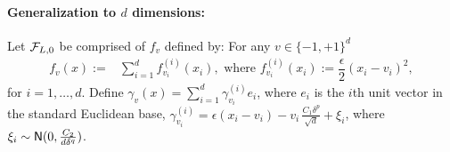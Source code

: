 \paragraph{Generalization to $d$ dimensions:}
Let $\mathcal{F}_{L,0}$ be comprised of $f_v$ defined by: For any $v\in \{-1,+1\}^d$
\begin{align*}
  f_v(x) :=& \sum_{i=1}^d f^{(i)}_{v_i}(x_i), \text{ where } f^{(i)}_{v_i}(x_i) := \dfrac{\epsilon}{2} (x_i - v_i)^2,
\end{align*}
for $i=1,\ldots,d$.
Define
$\gamma_v(x) = \sum_{i=1}^d \gamma_{v_i}^{(i)}e_i$, where 
$e_i$ is the $i$th unit vector in the standard Euclidean base,
$\gamma_{v_i}^{(i)} = \epsilon(x_i-v_i) - v_i\, \frac{C_1 \delta^p}{\sqrt{d}} + \xi_i$, where $\xi_i \sim \mathsf{N}(0,\frac{C_2}{d\delta^q})$. 

